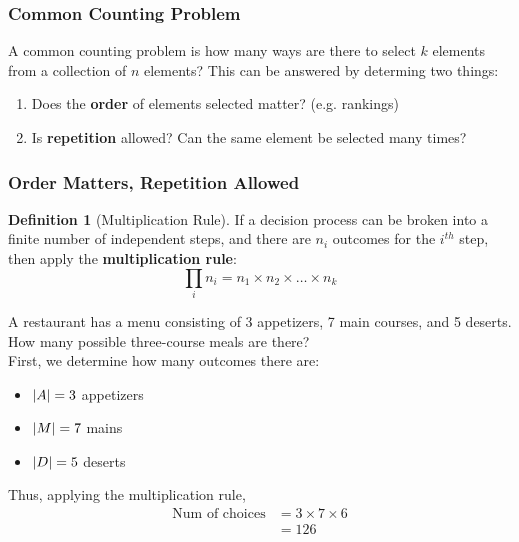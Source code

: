 \documentclass[12pt]{article}
\DeclarePairedDelimiter\abs{\lvert}{\rvert}
\theoremstyle{definition}
\newtheorem{definition}{Definition}
\begin{document}
    \subsubsection{Common Counting Problem}
    A common counting problem is how many ways are there to select $k$ elements from a collection of $n$ elements? This can be 
    answered by determing two things:
    \begin{enumerate}
        \item Does the \textbf{order} of elements selected matter? (e.g. rankings)
        \item Is \textbf{repetition} allowed? Can the same element be selected many times?
    \end{enumerate}


    \subsubsection{Order Matters, Repetition Allowed}
    \begin{definition}[Multiplication Rule]
        \label{def:multiplication-rule}
        If a decision process can be broken into a finite number of independent steps, and there are $n_i$ outcomes for the
        $i^{th}$ step, then apply the \textbf{multiplication rule}:
        \begin{equation*}
            \prod_i n_i = n_1 \times n_2 \times \dots \times n_k
        \end{equation*}
    \end{definition}

    \begin{example}
        A restaurant has a menu consisting of 3 appetizers, 7 main courses, and 5 deserts. How many possible three-course
        meals are there? \\

        First, we determine how many outcomes there are:
        \begin{itemize}
            \item $\abs{A} = 3$ appetizers
            \item $\abs{M} = 7$ mains
            \item $\abs{D} = 5$ deserts \\
        \end{itemize}
        Thus, applying the multiplication rule,
        \begin{align*}
            \text{Num of choices} &= 3 \times 7 \times 6 \\
            &= 126
        \end{align*}
    \end{example}
\end{document}
